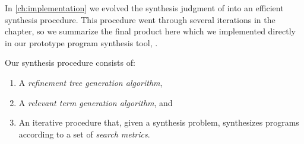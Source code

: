 In \autoref{ch:implementation} we evolved the synthesis judgment of \mlsyn{} into an efficient synthesis procedure.
This procedure went through several iterations in the chapter, so we summarize the final product here which we implemented directly in our prototype program synthesis tool, \myth{}.

Our synthesis procedure consists of:
\begin{enumerate}
  \item A \emph{refinement tree generation algorithm},
  \item A \emph{relevant term generation algorithm}, and
  \item An iterative procedure that, given a synthesis problem, synthesizes programs according to a set of \emph{search metrics}.
  \end{enumerate}


